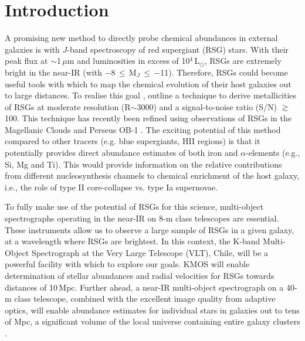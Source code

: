 \documentclass[manuscript]{aastex}
\def\2{\footnotesize II\normalsize}
\begin{document}
\section{Introduction}

\label{sec:introduction}
A promising new method to directly probe chemical abundances in external galaxies is with $J$-band spectroscopy of red supergiant (RSG) stars.
With their peak flux at
$\sim$1\,$\mu$m and luminosities in excess of
10$^4$\,L$_\odot$, RSGs are extremely bright in the near-IR
(with $-$8\,$\le$\,M$_{J}$\,$\le$\,$-$11).
Therefore, RSGs could become useful tools with which to map the chemical evolution of their host galaxies out to large distances.
To realise this goal
\cite{Davies10}, outline a technique to derive metallicities of RSGs at moderate resolution
(R$\sim$3000) and a signal-to-noise ratio (S/N)
$\gtrsim$ 100.
This technique has recently been refined using observations of RSGs in the Magellanic Clouds
\citep{Davies14} and Perseus OB-1
\citep{2014ApJ...788...58G}.
The exciting potential of this method compared to other tracers (e.g. blue supergiants, H\2 regions) is that it potentially provides direct abundance estimates of both iron and $\alpha$-elements (e.g., Si, Mg and Ti).
This would provide information on the relative contributions from different nucleosynthesis channels to chemical enrichment of the host galaxy,
i.e., the role of type II core-collapse vs. type Ia supernovae.

To fully make use of the potential of RSGs for this science, multi-object spectrographs operating in the near-IR on 8-m class telescopes are essential.
These instruments allow us to observe a large sample of RSGs in a given galaxy, at a wavelength where RSGs are brightest.
In this context, the K-band Multi-Object Spectrograph
\citep[KMOS;][]{2013Msngr.151...21S} at the Very Large Telescope (VLT), Chile, will be a powerful facility with which to explore our goals.
KMOS will enable determination of stellar abundances and radial velocities for RSGs towards distances of 10\,Mpc.
Further ahead, a near-IR multi-object spectrograph on a 40-m class telescope, combined with the excellent image quality from adaptive optics,
will enable abundance estimates for individual stars in galaxies out to tens of Mpc,
a significant volume of the local universe containing entire galaxy clusters
\citep{Evans11}.
\end{document}
